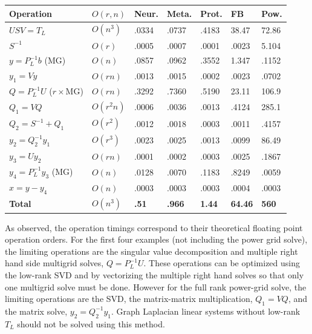 \documentclass{article}
\begin{document}
\begin{center}
\renewcommand{\arraystretch}{1.5}
    \begin{tabular}{ | l | l | l | l | l | l | l |}
    \hline
    \textbf{Operation} & \textbf{$O(r,n)$} & \textbf{Neur.} & \textbf{Meta.} & \textbf{Prot.} & \textbf{FB} & \textbf{Pow.} \\ \hline
    $USV = T_L$ & $O(n^3)$ & .0334 & .0737 & .4183 & 38.47 & 72.86  \\ \hline
    $S^{-1}$ & $O(r)$ & .0005 & .0007 & .0001 & .0023 & 5.104 \\ \hline
    $y = P_L^{-1}b$ (MG) & $O(n)$ & .0857 & .0962 & .3552 & 1.347 & .1152  \\  \hline
    $y_1 = Vy$ & $O(rn)$ & .0013 & .0015 & .0002 & .0023 & .0702 \\ \hline
    $Q = P_L^{-1}U$ ($r\times$MG) & $O(rn)$ & .3292 & .7360 & .5190 & 23.11 & 106.9  \\ \hline
    $Q_1 = VQ$ & $O(r^2 n)$ & .0006 & .0036 & .0013 & .4124 & 285.1 \\ \hline
    $Q_2 = S^{-1} + Q_1$ & $O(r^2)$ & .0012 & .0018 & .0003 & .0011 & .4157 \\ \hline
    $y_2 = Q_2^{-1}y_1$ & $O(r^3)$ & .0023 & .0025 & .0013 & .0099 & 86.49 \\ \hline
    $y_3 = Uy_2$ & $O(rn)$ & .0001 & .0002 & .0003 & .0025 & .1867 \\ \hline
    $y_4 = P_L^{-1}y_3$ (MG) & $O(n)$ &.0128 & .0070 & .1183 & .8249 & .0059 \\ \hline
    $x = y - y_4$ & $O(n)$ &.0003 & .0003 & .0003 & .0004 & .0003 \\ \hline
    \textbf{Total} & \textbf{$O(n^3)$} & \textbf{.51} & \textbf{.966} & \textbf{1.44} & \textbf{64.46} & \textbf{560} \\
    \hline
    \end{tabular}
\end{center}
As observed, the operation timings correspond to their theoretical floating point operation orders. For the first four examples (not including the power grid solve), the limiting operations are the singular value decomposition and multiple right hand side multigrid solves, $Q = P_L^{-1}U$. These operations can be optimized using the low-rank SVD and by vectorizing the multiple right hand solves so that only one multigrid solve must be done. However for the full rank power-grid solve, the limiting operations are the SVD, the matrix-matrix multiplication, $Q_1 = VQ$, and the matrix solve, $y_2 = Q_2^{-1}y_1$. Graph Laplacian linear systems without low-rank $T_L$ should not be solved using this method.

%
%
\end{document}
